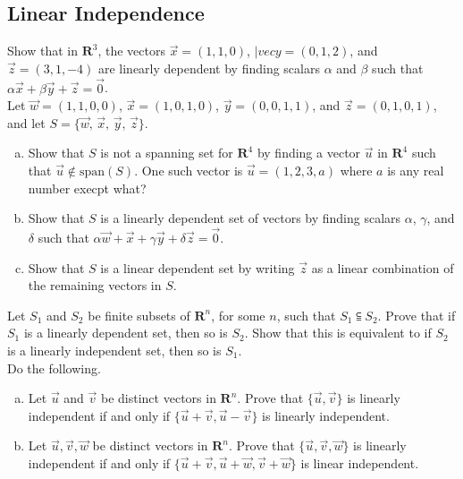\documentclass[a4paper,11pt]{article}
\newcommand{\R}{\mathbf{R}}
\begin{document}
\subsection*{Linear Independence}

 Show that in $\R^3$, the vectors $\vec
x=(1,1,0)$, $|vec y=(0,1,2)$, and $\vec z=(3,1,-4)$ are linearly dependent by
finding scalars $\alpha$ and $\beta$ such that $\alpha\vec x+\beta\vec y+\vec
z=\vec 0$. \\

 Let $\vec w=(1,1,0,0)$, $\vec x=(1,0,1,0)$, $\vec
y=(0,0,1,1)$, and $\vec z=(0,1,0,1)$, and let $S=\{\vec w,\,\vec x,\,\vec
y,\,\vec z\}$.
\begin{enumerate}[(a)]
\item Show that $S$ is not a spanning set for $\R^4$ by finding a vector $\vec
  u$ in $\R^4$ such that $\vec u \notin\text{span}(S)$. One such vector is $\vec
  u=(1,2,3,a)$ where $a$ is any real number execpt what?
\item Show that $S$ is a linearly dependent set of vectors by finding scalars
  $\alpha$, $\gamma$, and $\delta$ such that $\alpha\vec w+\vec x+\gamma\vec
  y+\delta\vec z=\vec 0$.
\item Show that $S$ is a linear dependent set by writing $\vec z$ as a linear
  combination of the remaining vectors in $S$.
\end{enumerate}

 Let $S_1$ and $S_2$ be finite subsets of $\R^n$,
for some $n$, such that $S_1 \subseteqq S_2$. Prove that if $S_1$ is a linearly
dependent set, then so is $S_2$. Show that this is equivalent to if $S_2$ is a
linearly independent set, then so is $S_1$. \\

 Do the following.
\begin{enumerate}[(a)]
\item Let $\vec u$ and $\vec v$ be distinct vectors in $\R^n$. Prove that
  $\{\vec u, \vec v\}$ is linearly independent if and only if $\{\vec u + \vec v,
  \vec u - \vec v\}$ is linearly independent.
\item Let $\vec u, \vec v, \vec w$ be distinct vectors in $\R^n$. Prove that
  $\{\vec u, \vec v, \vec w\}$ is linearly independent if and only if $\{\vec
  u+\vec v,\vec u+\vec w,\vec v+\vec w\}$ is linear independent. \\
\end{enumerate}
\end{document}
